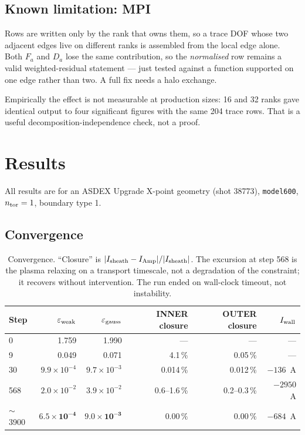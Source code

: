 \documentclass[11pt,a4paper]{article}
\newcommand{\code}[1]{\texttt{\small #1}}
\begin{document}
\subsection{Known limitation: MPI}

Rows are written only by the rank that owns them, so a trace DOF whose two adjacent edges live on
different ranks is assembled from the local edge alone. Both $F_a$ and $D_a$ lose the same
contribution, so the \emph{normalised} row remains a valid weighted-residual statement --- just tested
against a function supported on one edge rather than two. A full fix needs a halo exchange.

Empirically the effect is not measurable at production sizes: 16 and 32 ranks gave identical output to
four significant figures with the same 204 trace rows. That is a useful decomposition-independence
check, not a proof.

\section{Results}

All results are for an ASDEX Upgrade X-point geometry (shot 38773), \code{model600},
$n_{\rm tor}=1$, boundary type 1.

\subsection{Convergence}

\begin{table}[h]\centering\small
\begin{tabular}{@{}lrrrrr@{}}
\toprule
Step & $\varepsilon_{\rm weak}$ & $\varepsilon_{\rm gauss}$ & INNER closure & OUTER closure & $I_{\rm wall}$ \\
\midrule
0          & 1.759 & 1.990 & --- & --- & --- \\
9          & 0.049 & 0.071 & 4.1\,\% & 0.05\,\% & --- \\
30         & $9.9\times10^{-4}$ & $9.7\times10^{-3}$ & 0.014\,\% & 0.012\,\% & $-136$~A \\
568        & $2.0\times10^{-2}$ & $3.9\times10^{-2}$ & 0.6--1.6\,\% & 0.2--0.3\,\% & $-2950$~A \\
$\sim$3900 & $\bm{6.5\times10^{-4}}$ & $\bm{9.0\times10^{-3}}$ & $\bm{0.00\,\%}$ & $\bm{0.00\,\%}$ & $-684$~A \\
\bottomrule
\end{tabular}
\caption{Convergence. ``Closure'' is $|I_{\rm sheath}-I_{\rm Amp}|/|I_{\rm sheath}|$. The excursion at
step 568 is the plasma relaxing on a transport timescale, not a degradation of the constraint; it
recovers without intervention. The run ended on wall-clock timeout, not instability.}
\label{tab:conv}
\end{table}
\end{document}
